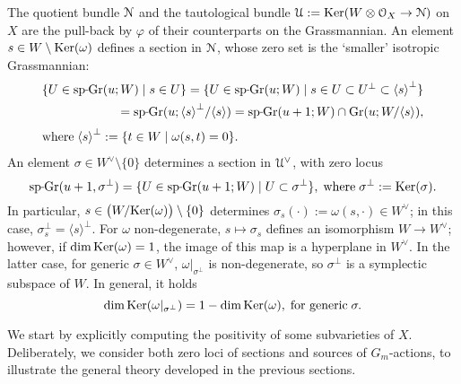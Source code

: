\documentclass[11pt,reqno]{amsart}
\let\mt\mapsto
\let\euf\EuScript
\let\vphi\varphi
\let\lan\langle
\let\ran\rangle
\numberwithin{equation}{section}
\numberwithin{figure}{section}
\let\si\sigma
\let\sm\setminus
\begin{document}
The quotient bundle ${{\euf N}}$ and the tautological bundle 
${{\euf U}}:={{\rm Ker}}(W\otimes{{\euf O}}_X\to{{\euf N}})$ on $X$ are the pull-back by $\vphi$ 
of their counterparts on the Grassmannian. 
An element $s\in W\sm{{\rm Ker}}(\omega)$ defines a section in ${{\euf N}}$, whose zero set is 
the `smaller' isotropic Grassmannian: 
\begin{equation}\label{eq:Ws}
\begin{array}{r}
\{U\in{{\rm sp{{{\vrule height2.75pt depth-2.35pt width2.3pt \kern1.7pt}}\!}Gr}}(u;W)\mid s\in U\}=
\{U\in{{\rm sp{{{\vrule height2.75pt depth-2.35pt width2.3pt \kern1.7pt}}\!}Gr}}(u;W)\mid s\in U\subset U^\perp\subset {{\lan {s}\ran}}^\perp\}
\\[1ex] 
={{\rm sp{{{\vrule height2.75pt depth-2.35pt width2.3pt \kern1.7pt}}\!}Gr}}(u;{{\lan {s}\ran}}^\perp/{{\lan {s}\ran}})={{\rm sp{{{\vrule height2.75pt depth-2.35pt width2.3pt \kern1.7pt}}\!}Gr}}(u+1;W)\cap {{\rm Gr}}(u;W/{{\lan {s}\ran}}),
\\[1.5ex]
\text{where}\;{{\lan {s}\ran}}^\perp:=\{t\in W\mid\omega(s,t)=0\}.\hfill\null
\end{array}
\end{equation}
An element $\si\in W^\vee\sm\{0\}$ determines a section in ${{\euf U}}^\vee$, with zero locus  
\begin{equation}\label{eq:Wsi}
{{\rm sp{{{\vrule height2.75pt depth-2.35pt width2.3pt \kern1.7pt}}\!}Gr}}(u+1,\si^\perp)=\{U\in{{\rm sp{{{\vrule height2.75pt depth-2.35pt width2.3pt \kern1.7pt}}\!}Gr}}(u+1;W)\mid U\subset\si^\perp\},
\;\text{where}\;
\si^\perp:={{\rm Ker}}(\si).
\end{equation}
In particular, $s\in\big(W/{{\rm Ker}}(\omega)\big)\sm\{0\}$ determines 
$\si_s(\cdot):=\omega(s,\cdot)\in W^\vee$; in this case, $\si_s^\perp={{\lan {s}\ran}}^\perp$. 
For $\omega$ non-degenerate, $s\mt\si_s$ defines an isomorphism $W\to W^\vee$; 
however, if $\dim{{\rm Ker}}(\omega)=1$, the image of this map is a hyperplane in $W^\vee$. 
In the latter case, for generic $\si\in W^\vee$, $\omega|_{\si^\perp}$ is 
non-degenerate, so $\si^\perp$ is a symplectic subspace of $W$. In general, it holds 
\begin{equation}\label{eq:ker}
\dim{{\rm Ker}}(\omega|_{\si^\perp})=1-\dim{{\rm Ker}}(\omega), 
\;\text{for generic}\;\si.
\end{equation}

We start by explicitly computing the positivity of some subvarieties of $X$. Deliberately, 
we consider both zero loci of sections and sources of $G_m$-actions, to illustrate 
the general theory developed in the previous sections. 
\end{document}
